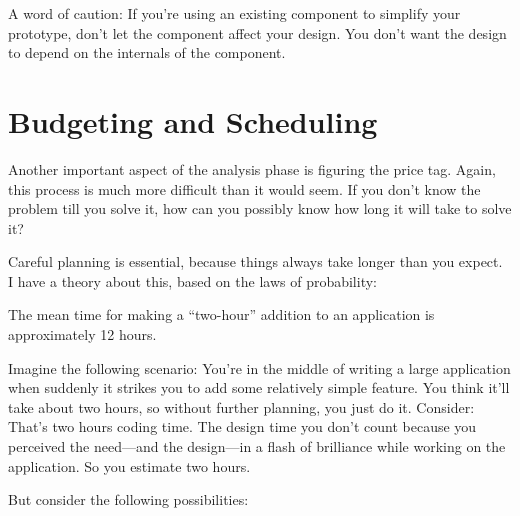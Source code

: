 \noindent A word of caution: If you're using an existing component to
simplify your prototype, don't let the component affect your design.
You don't want the design to depend on the internals of the component.

\section{Budgeting and Scheduling}

Another important aspect of the analysis phase is figuring the price
tag.  Again, this process is much more difficult than it would seem.
If you don't know the problem till you solve it, how can you possibly
know how long it will take to solve it?

Careful planning is essential, because things always take longer than
you expect. I have a theory about this, based on the laws of
probability:



\begin{tip}
The mean time for making a ``two-hour'' addition to an application is
approximately 12 hours.
\end{tip}

\noindent Imagine the following scenario: You're in the middle of
writing a large application when suddenly it strikes you to add some
relatively simple feature. You think it'll take about two hours, so
without further planning, you just do it. Consider: That's two hours
coding time. The design time you don't count because you perceived the
need---and the design---in a flash of brilliance while working on the
application. So you estimate two hours.

But consider the following possibilities:

